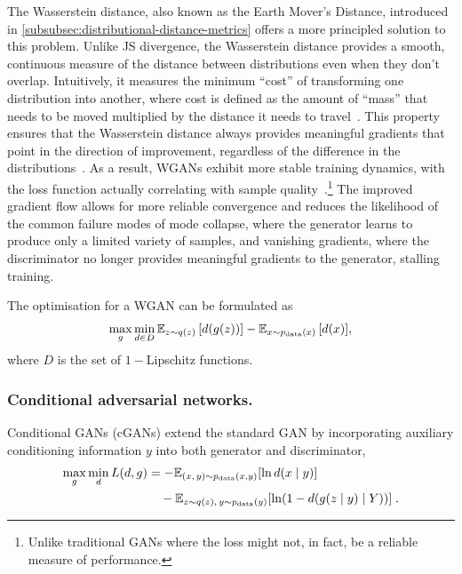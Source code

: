         The Wasserstein distance, also known as the Earth Mover's Distance, introduced in \cref{subsubsec:distributional-distance-metrics} offers a more principled solution to this problem.
        Unlike JS divergence, the Wasserstein distance provides a smooth, continuous measure of the distance between distributions even when they don't overlap.
        Intuitively, it measures the minimum ``cost'' of transforming one distribution into another, where cost is defined as the amount of ``mass'' that needs to be moved multiplied by the distance it needs to travel~\cite{villani_wasserstein_2009}.
        This property ensures that the Wasserstein distance always provides meaningful gradients that point in the direction of improvement, regardless of the difference in the distributions~\cite{arjovsky_wasserstein_2017}.
        As a result, WGANs exhibit more stable training dynamics, with the loss function actually correlating with sample quality~\cite{stephanovitch_optimal_2023, carrazza_lund_2019, buhmann_hadrons_2021}.\footnote{Unlike traditional GANs where the loss might not, in fact, be a reliable measure of performance.}
        The improved gradient flow allows for more reliable convergence and reduces the likelihood of the common failure modes of mode collapse, where the generator learns to produce only a limited variety of samples, and vanishing gradients, where the discriminator no longer provides meaningful gradients to the generator, stalling training.

        The optimisation for a WGAN can be formulated as
        \begin{equation}
            \max_g\min_{d\in D}\operatorname{\mathbb{E}}_{z\sim q(z)} \qty[d(g(z))] - \operatorname{\mathbb{E}}_{x\sim p_{\text{data}}(x)} \qty[d(x)],
        \end{equation}
        where $D$ is the set of \(1-\)Lipschitz functions.
    \subsubsection{Conditional adversarial networks.}
    
       Conditional GANs (cGANs) extend the standard GAN by incorporating auxiliary conditioning information \(y\) into both generator and discriminator,
        \begin{equation}
            \begin{split}
                \max_g \min_d L(d, g) &= -\mathbb{E}_{(x,\,y) \sim p_{\text{data}}(x,y)}\qty[\ln d(x\mid y)] \\
                &\quad - \mathbb{E}_{z \sim q(z),\,y \sim p_{\text{data}}(y)}\qty[\ln(1 - d(g(z\mid y) \mid Y))]\;.
            \end{split}
        \end{equation}
        
